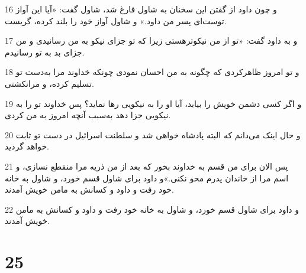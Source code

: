 \par 16 و چون داود از گفتن این سخنان به شاول فارغ شد، شاول گفت: «آیا این آواز توست‌ای پسر من داود.» و شاول آواز خود را بلند کرده، گریست.
\par 17 و به داود گفت: «تو از من نیکوترهستی زیرا که تو جزای نیکو به من رسانیدی و من جزای بد به تو رسانیدم.
\par 18 و تو امروز ظاهرکردی که چگونه به من احسان نمودی چونکه خداوند مرا به‌دست تو تسلیم کرده، و مرانکشتی.
\par 19 و اگر کسی دشمن خویش را بیابد، آیا او را به نیکویی رها نماید؟ پس خداوند تو را به نیکویی جزا دهد به‌سبب آنچه امروز به من کردی.
\par 20 و حال اینک می‌دانم که البته پادشاه خواهی شد و سلطنت اسرائیل در دست تو ثابت خواهد گردید.
\par 21 پس الان برای من قسم به خداوند بخور که بعد از من ذریه مرا منقطع نسازی، و اسم مرا از خاندان پدرم محو نکنی.»و داود برای شاول قسم خورد، و شاول به خانه خود رفت و داود و کسانش به مامن خویش آمدند.
\par 22 و داود برای شاول قسم خورد، و شاول به خانه خود رفت و داود و کسانش به مامن خویش آمدند.
 
\chapter{25}

